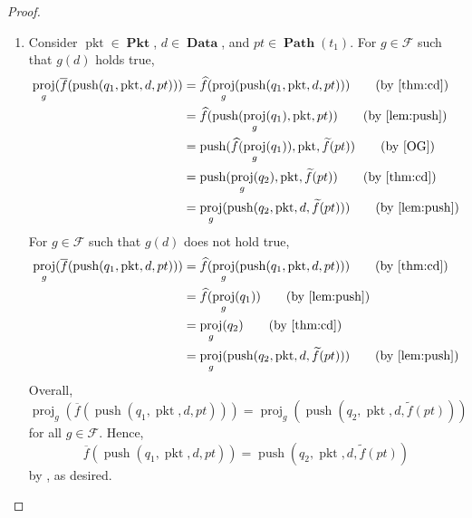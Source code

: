 \documentclass{amsart}
\makeatletter
\DeclareMathOperator{\pkt}{\mathrm{pkt}}
\DeclareMathOperator{\push}{\mathrm{push}}
\DeclareMathOperator{\proj}{\mathrm{proj}}
\DeclareMathOperator{\Pkt}{\mathbf{Pkt}}
\DeclareMathOperator{\Data}{\mathbf{Data}}
\DeclareMathOperator{\Path}{\mathbf{Path}}
\theoremstyle{definition}
\newcommand{\leqnomode}{\tagsleft@true\let\veqno\@@leqno}
\makeatother
\begin{document}
\begin{proof}
\begin{enumerate}
        \leqnomode

        \item Consider $\pkt \in \Pkt$, $d \in \Data$, and $pt \in \Path(t_1)$.
            For $g \in \mathcal F$ such that $g(d)$ holds true,
            \begin{align*}
                \proj_g(\overline{f}(\push(q_1, \pkt, d, pt)))
                &= \widehat{f}(\proj_g(\push(q_1, \pkt, d, pt))) \tag{by \Cref{thm:cd}}\\
                &= \widehat{f}(\push(\proj_g(q_1), \pkt, pt)) \tag{by \Cref{lem:push}}\\
                &= \push(\widehat{f}(\proj_g(q_1)), \pkt, \widetilde{f}(pt)) \tag{by \cite[Lemma ~5.9]{OG}}\\
                &= \push(\proj_g(q_2), \pkt, \widetilde{f}(pt)) \tag{by \Cref{thm:cd}}\\
                &= \proj_g(\push(q_2, \pkt, d, \widetilde{f}(pt))) \tag{by \Cref{lem:push}}
            \end{align*}
            For $g \in \mathcal F$ such that $g(d)$ does not hold true,
            \begin{align*}
                \proj_g(\overline{f}(\push(q_1, \pkt, d, pt)))
                &= \widehat{f}(\proj_g(\push(q_1, \pkt, d, pt))) \tag{by \Cref{thm:cd}}\\
                &= \widehat{f}(\proj_g(q_1)) \tag{by \Cref{lem:push}}\\
                &= \proj_g(q_2) \tag{by \Cref{thm:cd}}\\
                &= \proj_g(\push(q_2, \pkt, d, \widetilde{f}(pt))) \tag{by \Cref{lem:push}}
            \end{align*}
            Overall,
            $
                \proj_g(\overline{f}(\push(q_1, \pkt, d, pt)))
                = 
                \proj_g(\push(q_2, \pkt, d, \widetilde{f}(pt)))
            $
            for all $g \in \mathcal F$. 
            Hence,
            $$
                \overline{f}(\push(q_1, \pkt, d, pt))
                = 
                \push(q_2, \pkt, d, \widetilde{f}(pt))
            $$
            by , as desired.
    \end{enumerate}
\end{proof}

\newpage 

\renewcommand\refname{\LARGE References}


\end{document}
